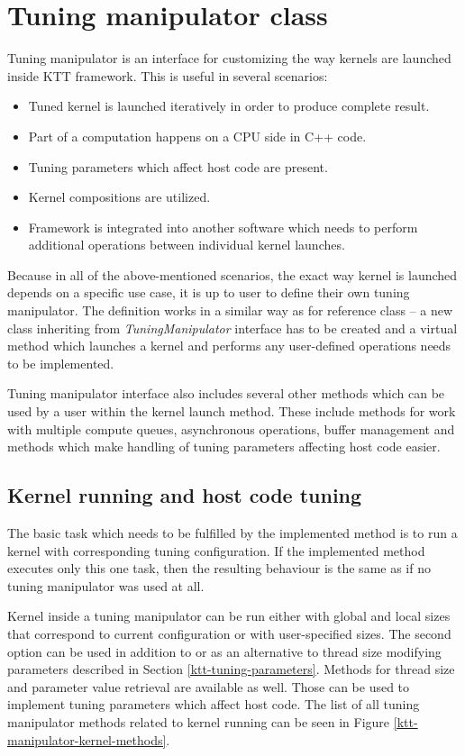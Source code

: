 \documentclass
[
    digital, %
    oneside, %
    table, %
    nolof, %
    nolot, %
    nocover %
]{fithesis3}
\begin{document}
\section{Tuning manipulator class}
\label{ktt-manipulator}
Tuning manipulator is an interface for customizing the way kernels are launched inside KTT framework. This is useful in several scenarios:
\begin{itemize}
    \item Tuned kernel is launched iteratively in order to produce complete result.
    \item Part of a computation happens on a CPU side in C++ code.
    \item Tuning parameters which affect host code are present.
    \item Kernel compositions are utilized.
    \item Framework is integrated into another software which needs to perform additional operations between individual kernel launches.
\end{itemize}
Because in all of the above-mentioned scenarios, the exact way kernel is launched depends on a specific use case, it is up to user to define their own
tuning manipulator. The definition works in a similar way as for reference class -- a new class inheriting from \textit{TuningManipulator} interface
has to be created and a virtual method which launches a kernel and performs any user-defined operations needs to be implemented.

Tuning manipulator interface also includes several other methods which can be used by a user within the kernel launch method. These include methods
for work with multiple compute queues, asynchronous operations, buffer management and methods which make handling of tuning parameters affecting
host code easier.

\subsection{Kernel running and host code tuning}
The basic task which needs to be fulfilled by the implemented method is to run a kernel with corresponding tuning configuration. If the implemented
method executes only this one task, then the resulting behaviour is the same as if no tuning manipulator was used at all.

Kernel inside a tuning manipulator can be run either with global and local sizes that correspond to current configuration or with user-specified sizes.
The second option can be used in addition to or as an alternative to thread size modifying parameters described in Section \ref{ktt-tuning-parameters}.
Methods for thread size and parameter value retrieval are available as well. Those can be used to implement tuning parameters which affect host code.
The list of all tuning manipulator methods related to kernel running can be seen in Figure \ref{ktt-manipulator-kernel-methods}.
\end{document}
